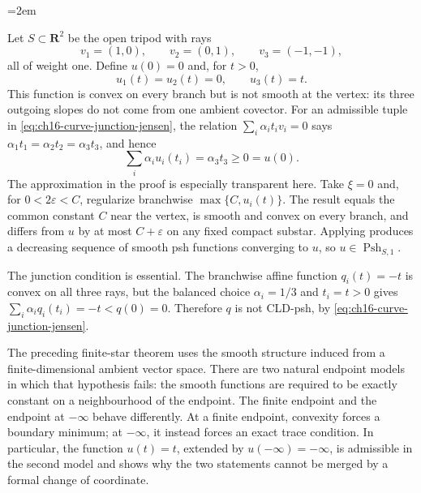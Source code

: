 
\begingroup
\emergencystretch=2em

\endgroup

\begin{example}
\label{ex:ch16-collapse-weighted-tripod}
Let $S\subset\mathbf R^2$ be the open tripod with rays
\[
 v_1=(1,0),\qquad v_2=(0,1),\qquad v_3=(-1,-1),
\]
all of weight one.  Define $u(0)=0$ and, for $t>0$,
\[
                         u_1(t)=u_2(t)=0,
 \qquad                   u_3(t)=t.
\]
This function is convex on every branch but is not smooth at the vertex:
its three outgoing slopes do not come from one ambient covector.  For an
admissible tuple in \eqref{eq:ch16-curve-junction-jensen}, the relation
$\sum_i\alpha_it_iv_i=0$ says
$\alpha_1t_1=\alpha_2t_2=\alpha_3t_3$, and hence
\[
                   \sum_i\alpha_i u_i(t_i)=\alpha_3t_3\geq0=u(0).
\]
The approximation in the proof is especially transparent here.  Take
$\xi=0$ and, for $0<2\varepsilon<C$, regularize branchwise
$\max\{C,u_i(t)\}$.  The result equals the common constant $C$ near the
vertex, is smooth and convex on every branch, and differs from $u$ by at
most $C+\varepsilon$ on any fixed compact substar.  Applying
 produces a decreasing sequence of smooth psh
functions converging to $u$, so $u\in\operatorname{Psh}_{S,1}$.

The junction condition is essential.  The branchwise affine function
$q_i(t)=-t$ is convex on all three rays, but the balanced choice
$\alpha_i=1/3$ and $t_i=t>0$ gives
$\sum_i\alpha_iq_i(t_i)=-t<q(0)=0$.  Therefore $q$ is not CLD-psh, by
\eqref{eq:ch16-curve-junction-jensen}.
\end{example}

The preceding finite-star theorem uses the smooth structure induced from a
finite-dimensional ambient vector space.  There are two natural endpoint
models in which that hypothesis fails: the smooth functions are required to
be exactly constant on a neighbourhood of the endpoint.  The finite endpoint
and the endpoint at $-\infty$ behave differently.  At a finite endpoint,
convexity forces a boundary minimum; at $-\infty$, it instead forces an exact
trace condition.  In particular, the function $u(t)=t$, extended by
$u(-\infty)=-\infty$, is admissible in the second model and shows why the two
statements cannot be merged by a formal change of coordinate.

